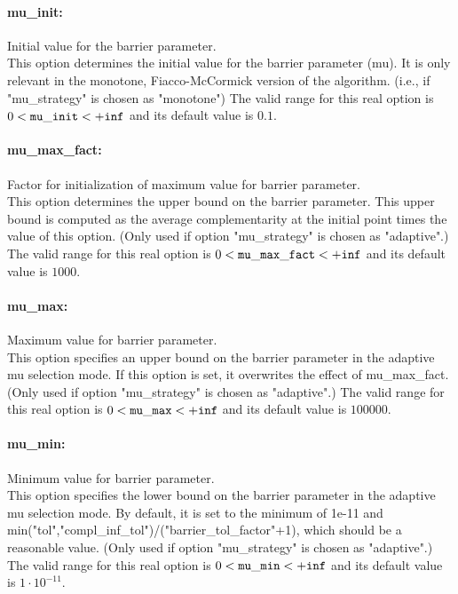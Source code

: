 \paragraph{mu\_init:}\label{opt:mu_init} Initial value for the barrier parameter. \\
 This option determines the initial value for the barrier parameter (mu).  It is only relevant in the monotone, Fiacco-McCormick version of the algorithm. (i.e., if "mu\_strategy" is chosen as "monotone") The valid range for this real option is 
$0 <  {\tt mu\_init } <  {\tt +inf}$
and its default value is $0.1$.


\paragraph{mu\_max\_fact:}\label{opt:mu_max_fact} Factor for initialization of maximum value for barrier parameter. \\
 This option determines the upper bound on the barrier parameter.  This upper bound is computed as the average complementarity at the initial point times the value of this option. (Only used if option "mu\_strategy" is chosen as "adaptive".) The valid range for this real option is 
$0 <  {\tt mu\_max\_fact } <  {\tt +inf}$
and its default value is $1000$.


\paragraph{mu\_max:}\label{opt:mu_max} Maximum value for barrier parameter. \\
 This option specifies an upper bound on the barrier parameter in the adaptive mu selection mode.  If this option is set, it overwrites the effect of mu\_max\_fact. (Only used if option "mu\_strategy" is chosen as "adaptive".) The valid range for this real option is 
$0 <  {\tt mu\_max } <  {\tt +inf}$
and its default value is $100000$.


\paragraph{mu\_min:}\label{opt:mu_min} Minimum value for barrier parameter. \\
 This option specifies the lower bound on the barrier parameter in the adaptive mu selection mode. By default, it is set to the minimum of 1e-11 and min("tol","compl\_inf\_tol")/("barrier\_tol\_factor"+1), which should be a reasonable value. (Only used if option "mu\_strategy" is chosen as "adaptive".) The valid range for this real option is 
$0 <  {\tt mu\_min } <  {\tt +inf}$
and its default value is $1 \cdot 10^{-11}$.


